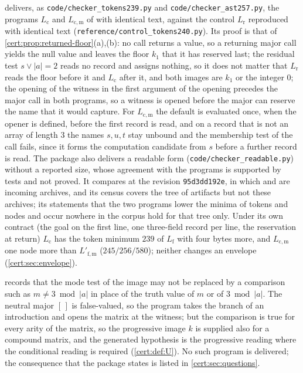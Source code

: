 \begin{remark}\label{cert:rem:conditional-image}
 delivers, as \texttt{code/checker\_tokens239.py} and
\texttt{code/checker\_ast257.py}, the programs $L_{\mathrm c}$ and
$L_{\mathrm{c,m}}$ of  with identical text, against the
control $L_{\mathrm r}$ reproduced with identical text
(\texttt{reference/control\_tokens240.py}). Its proof is that of
\cref{cert:prop:returned-floor}(a),(b): no call returns a value, so a returning
major call yields the null value and leaves the floor $k_1$ that it has
reserved last; the residual test $s\lor\lvert a\rvert=2$ reads no record and
assigns nothing, so it does not matter that $L_{\mathrm r}$ reads the floor
before it and $L_{\mathrm c}$ after it, and both images are $k_1$ or the integer
$0$; the opening of the witness in the first argument of the opening precedes the
major call in both programs, so a witness is opened before the major can reserve
the name that it would capture. For $L_{\mathrm{c,m}}$ the default is evaluated
once, when the opener is defined, before the first record is read, and on a record
that is not an array of length $3$ the names $s,u,t$ stay unbound and the
membership test of the call fails, since it forms the computation candidate from
$s$ before a further record is read. The package also delivers a readable form
(\texttt{code/checker\_readable.py}) without a reported size, whose agreement with
the programs is supported by tests and not proved. It compares at the revision
\texttt{95d3dd192e}, in which  and
 are incoming archives, and its census covers
the tree of artifacts but not these archives; its statements that the two
programs lower the minima of tokens and nodes and occur nowhere in the corpus hold
for that tree only. Under its own contract (the goal on the first line, one
three-field record per line, the reservation at return) $L_{\mathrm c}$ has the
token minimum $239$ of $L_{\mathrm f}$ with four bytes more, and $L_{\mathrm{c,m}}$
one node more than $L'_{\mathrm{f,m}}$ ($245/256/580$); neither changes an
envelope (\cref{cert:sec:envelope}).
\end{remark}

\begin{remark}\label{cert:rem:rejected-mode}
 records that the mode test of the image may not be
replaced by a comparison such as $m\neq 3\bmod\lvert a\rvert$ in place of the
truth value of $m$ or of $3\bmod\lvert a\rvert$. The neutral major $[\,]$ is
false-valued, so the program takes the branch of an introduction and opens the
matrix at the witness; but the comparison is true for every arity of the matrix,
so the progressive image $k$ is supplied also for a compound matrix, and the
generated hypothesis is the progressive reading where the conditional reading is
required (\cref{cert:def:U}). No such program is delivered; the consequence that
the package states is listed in \cref{cert:sec:questions}.
\end{remark}

